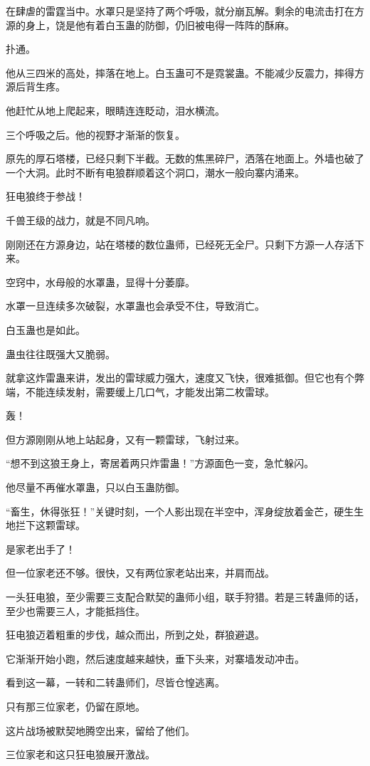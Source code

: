 \begin{this_body}
在肆虐的雷霆当中。水罩只是坚持了两个呼吸，就分崩瓦解。剩余的电流击打在方源的身上，饶是他有着白玉蛊的防御，仍旧被电得一阵阵的酥麻。

扑通。

他从三四米的高处，摔落在地上。白玉蛊可不是霓裳蛊。不能减少反震力，摔得方源后背生疼。

他赶忙从地上爬起来，眼睛连连眨动，泪水横流。

三个呼吸之后。他的视野才渐渐的恢复。

原先的厚石塔楼，已经只剩下半截。无数的焦黑碎尸，洒落在地面上。外墙也破了一个大洞。此时不断有电狼群顺着这个洞口，潮水一般向寨内涌来。

狂电狼终于参战！

千兽王级的战力，就是不同凡响。

刚刚还在方源身边，站在塔楼的数位蛊师，已经死无全尸。只剩下方源一人存活下来。

空窍中，水母般的水罩蛊，显得十分萎靡。

水罩一旦连续多次破裂，水罩蛊也会承受不住，导致消亡。

白玉蛊也是如此。

蛊虫往往既强大又脆弱。

就拿这炸雷蛊来讲，发出的雷球威力强大，速度又飞快，很难抵御。但它也有个弊端，不能连续发射，需要缓上几口气，才能发出第二枚雷球。

轰！

但方源刚刚从地上站起身，又有一颗雷球，飞射过来。

“想不到这狼王身上，寄居着两只炸雷蛊！”方源面色一变，急忙躲闪。

他尽量不再催水罩蛊，只以白玉蛊防御。

“畜生，休得张狂！”关键时刻，一个人影出现在半空中，浑身绽放着金芒，硬生生地拦下这颗雷球。

是家老出手了！

但一位家老还不够。很快，又有两位家老站出来，并肩而战。

一头狂电狼，至少需要三支配合默契的蛊师小组，联手狩猎。若是三转蛊师的话，至少也需要三人，才能抵挡住。

狂电狼迈着粗重的步伐，越众而出，所到之处，群狼避退。

它渐渐开始小跑，然后速度越来越快，垂下头来，对寨墙发动冲击。

看到这一幕，一转和二转蛊师们，尽皆仓惶逃离。

只有那三位家老，仍留在原地。

这片战场被默契地腾空出来，留给了他们。

三位家老和这只狂电狼展开激战。


\end{this_body}
